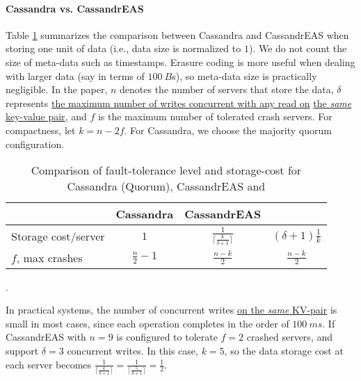 \paragraph*{Cassandra vs. CassandrEAS}
Table \ref{t:comparison} summarizes the comparison between Cassandra and CassandrEAS when storing one unit of data (i.e., data size is normalized to $1$). We do not count the size of meta-data such as timestamps. Erasure coding is more useful when dealing with larger data (say in terms of $100~B$s), so meta-data size is practically negligible. 
In the paper, $n$ denotes the number of servers that store the data, $\delta$ represents \underline{the maximum number of writes concurrent with any read on} \underline{the \textit{same} key-value pair}, and $f$ is the maximum number of tolerated crash servers.
For compactness, let $k = n-2f$. For Cassandra, we choose the majority quorum configuration.

\begin{table}[h]
	\centering
	\begin{tabular}{ l|c|c|c}
		& Cassandra &  CassandrEAS  & \treas\\ \hline
		Storage cost/server & $1$ &  $\frac{1}{ \lceil\frac{k}{\delta+1}\rceil}$ 
		& $(\delta +1)\frac{1}{k}$ \\
	
		$f$, max crashes & $\frac{n}{2} - 1$  &  $\frac{n-k}{2}$ & $\frac{n-k}{2}$ \\%
	\end{tabular}
	\caption{Comparison of fault-tolerance level and storage-cost for Cassandra (Quorum), CassandrEAS and \treas}.
	\label{t:comparison}
	\vspace{-10pt}
\end{table}

In practical systems, the number of concurrent writes \underline{on the \textit{same} KV-pair} is small in most cases, since each operation completes in the order of $100~ms$. If CassandrEAS with $n=9$ is configured to tolerate $f=2$ crashed servers, and support $\delta = 3$ concurrent writes. In this case, $k = 5$, so the data storage cost at each server becomes
$\frac{1}{ \lceil\frac{k}{\delta+1}\rceil} = \frac{1}{ \lceil\frac{5}{3+1}\rceil} = \frac{1}{2}$.

